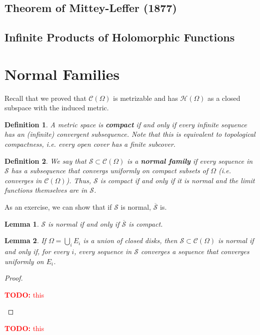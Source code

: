 \documentclass{article}
\newtheorem{lemma}{Lemma}
\newcommand{\mc}[1]{\mathcal{#1}}
\newtheorem{definition}{Definition}
\newcommand{\TODO}[1]{\begin{center}\huge{\textcolor{red}{\textbf{TODO:} #1}}\end{center}}
\begin{document}
\subsection{Theorem of Mittey-Leffer (1877)}

\subsection{Infinite Products of Holomorphic Functions}

\section{Normal Families}

Recall that we proved that \(\mc{C}(\Omega)\) is metrizable and has \(\mc{H}(\Omega)\) as a closed subspace with the induced metric.
\begin{definition}
A metric space is \textbf{compact} if and only if every infinite sequence has an (infinite) convergent subsequence. Note that this is equivalent to topological compactness, i.e. every open cover has a finite subcover.
\end{definition}
\begin{definition}
We say that \(\mc{S} \subset \mc{C}(\Omega)\) is a \textbf{normal family} if every sequence in \(\mc{S}\) has a subsequence that convergs uniformly on compact subsets of \(\Omega\) (i.e. converges in \(\mc{C}(\Omega)\)). Thus, \(\mc{S}\) is compact if and only if it is normal and the limit functions themselves are in \(\mc{S}\).
\end{definition}
As an exercise, we can show that if \(\mc{S}\) is normal, \(\overline{\mc{S}}\) is.
\begin{lemma}
\(\mc{S}\) is normal if and only if \(\overline{\mc{S}}\) is compact.
\end{lemma}
\begin{lemma}
If \(\Omega = \bigcup_iE_i\) is a union of closed disks, then \(\mc{S} \subset \mc{C}(\Omega)\) is normal if and only if, for every \(i\), every sequence in \(\mc{S}\) converges a sequence that converges uniformly on \(E_i\).
\end{lemma}
\begin{proof}
\TODO{this}
\end{proof}

\TODO{this}
\end{document}
